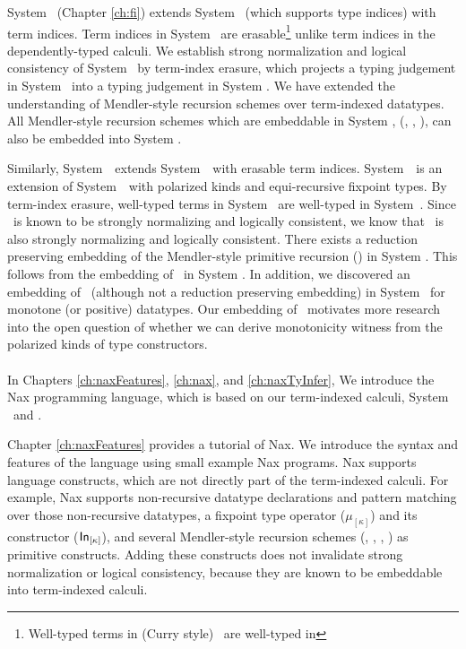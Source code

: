 System \Fi\ (Chapter \ref{ch:fi}) extends System \Fw\ (which supports
type indices) with term indices.  Term indices in System \Fi\ are 
erasable\footnote{Well-typed terms in (Curry style) \Fi\ are well-typed in \Fw} unlike
term indices in the dependently-typed calculi. We establish
strong normalization and logical consistency of System \Fi\ by
term-index erasure, which projects a typing judgement in System \Fi\ into
a typing judgement in System \Fw. We have extended the understanding of
Mendler-style recursion schemes over term-indexed datatypes. All
Mendler-style recursion schemes which are embeddable in System \Fw,
(\eg, \MIt, \MsfIt), can also be embedded into System \Fi.

Similarly, System~\Fixi\ extends System~\Fixw\ with erasable term indices.
System~\Fixw\ is an extension of System~\Fw\ with polarized kinds and
equi-recursive fixpoint types. By term-index erasure, well-typed terms
in System \Fixi\ are well-typed in System~\Fixw. Since \Fixw\ is known
to be strongly normalizing and logically consistent, we know that \Fixi\ is
also strongly normalizing and logically consistent.
There exists a reduction preserving embedding of the Mendler-style
primitive recursion (\MPr) in System \Fixi. This follows
from the embedding of \MPr\ in System \Fixw. 
In addition, we discovered an embedding of \McvPr\ 
(although not a reduction preserving embedding) in System \Fixi\ for monotone
(or positive)
datatypes. Our embedding of \McvPr\ motivates more research into
the open question of
whether we can derive monotonicity witness from the polarized kinds of
type constructors.

\paragraph{}
In Chapters \ref{ch:naxFeatures}, \ref{ch:nax}, and \ref{ch:naxTyInfer},
We introduce the Nax programming language, which is based on
our term-indexed calculi, System \Fi\ and \Fixi.

Chapter \ref{ch:naxFeatures} provides a tutorial of Nax.
We introduce the syntax and features of the language
using small example Nax programs.
Nax supports language constructs,
which are not directly part of the term-indexed calculi.
For example, Nax supports non-recursive datatype declarations and
pattern matching over those non-recursive datatypes,
a fixpoint type operator ($\mu_{[\kappa]}$) and
its constructor ($\mathsf{In}_{[\kappa]}$), and
several Mendler-style recursion schemes (\MIt, \MPr, \McvPr, \MsfIt)
as primitive constructs. 
Adding these constructs does not invalidate
strong normalization or logical consistency, because they are known to
be embeddable into term-indexed calculi.



